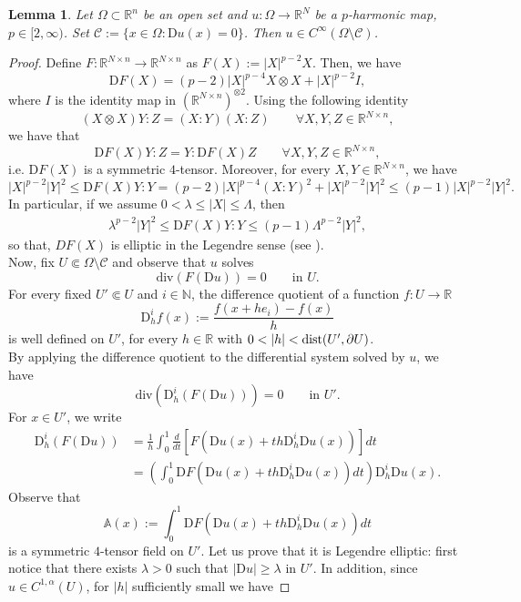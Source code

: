 \documentclass[a4paper,11pt]{article}
\numberwithin{equation}{section}
\newtheorem{Lemma}[Theorem]{Lemma}
\newcommand{\numberset}{\mathbb}
\newcommand{\N}{\numberset{N}}
\newcommand{\Om}{\Omega}
\newcommand{\R}{\numberset{R}}
\newcommand{\rom}{\mathrm}
\theoremstyle{definition}
\begin{document}
\begin{Lemma}\label{smoothness}
Let $\Om\subset\R^n$ be an open set and $u:\Om\to\R^N$ be a $p$-harmonic map, $p\in[2,\infty)$. Set $\mathscr{C}:=\{x\in\Om:\mathrm Du(x)=0\}$. Then $u\in C^\infty(\Omega\setminus\mathscr C)$.
\end{Lemma}
\begin{proof}
Define $F:\R^{N\times n}\to \R^{N\times n}$ as $F(X):=|X|^{p-2}X$. Then, we have
$$
\rom DF(X)=(p-2)|X|^{p-4}X\otimes X+|X|^{p-2}I,
$$
where $I$ is the identity map in $(\R^{N\times n})^{\otimes 2}$.
Using the following identity
$$
(X\otimes X)Y:Z=(X:Y)(X:Z)\qquad\forall X,Y,Z\in \R^{N\times n},
$$ 
we have that
$$
\rom DF(X) Y:Z=Y:\rom DF(X)Z\qquad\forall X,Y,Z\in \R^{N\times n},
$$
i.e. $\rom DF(X)$ is a symmetric $4$-tensor.
Moreover, for every $X,Y\in \R^{N\times n}$, we have
$$
|X|^{p-2}|Y|^2\leq \rom DF(X)Y:Y=(p-2)|X|^{p-4}(X:Y)^2+|X|^{p-2}|Y|^2\leq(p-1)|X|^{p-2}|Y|^2.
$$
In particular, if we assume $0<\lambda\leq|X|\leq\Lambda$, then
\begin{align}\label{ellip}
\lambda^{p-2}|Y|^2\leq \rom DF(X)Y:Y\leq(p-1)\Lambda^{p-2}|Y|^2,
\end{align}
so that, $DF(X)$ is elliptic in the Legendre sense (see \cite{GM}).\\
Now, fix $U\Subset\Omega\setminus\mathscr C$ and observe that $u$ solves 
$$
\mathrm{div}(F(\rom Du))=0 \qquad\mbox{in }U.
$$
For every fixed $U'\Subset U$ and $i\in\N$, the difference quotient of a function $f:U\to \R$
$$
\rom D_h^if(x):=\frac{f(x+he_i)-f(x)}{h}
$$
is well defined on $U'$, for every $h\in \R$ with $0<|h|<{\rm dist}(U',\partial U)$. \\
By applying the difference quotient to the differential system solved by $u$, we have
$$
\mathrm{div}(\rom D_h^i(F(\rom Du)))=0 \qquad\mbox{in }U'.
$$
For $x\in U'$, we write
\begin{align*}
\rom D_h^i(F(\rom Du))&=\frac{1}{h}\int_0^1\frac{d}{dt} \left[F\left(\rom Du(x)+th\rom D_h^i\rom Du(x)\right)\right]dt\\
&=\left(\int_0^1\rom DF\left(\rom Du(x)+th\rom D_h^i\rom Du(x)\right)dt\right) \rom D_h^i \rom Du(x).
\end{align*}
Observe that
$$
\mathbb A(x):=\int_0^1\rom DF\left(\rom Du(x)+th\rom D_h^i\rom Du(x)\right)dt
$$
is a symmetric $4$-tensor field on $U'$. Let us prove that it is Legendre elliptic: first notice that there exists $\lambda>0$ such that $|\rom Du|\geq\lambda$ in $U'$. In addition, since $u\in C^{1,\alpha}(U)$, for $|h|$ sufficiently small we have

\end{proof}
\end{document}
